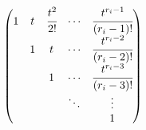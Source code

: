 {\begin{solution}
\begin{align*}
\begin{pmatrix}
                                                                                 1 & t & \cfrac{t^2}{2!} & \cdots & \cfrac{t^{r_i-1}}{\left(r_i-1\right)!}  \\
                                                                                   & 1 & t               & \cdots & \cfrac{t^{r_i-2}}{\left(r_i-2\right)!}  \\
                                                                                   &   & 1               & \cdots & \cfrac{t^{r_i-3}}{\left(r_i-3 \right)!} \\
                                                                                   &   &                 & \ddots & \vdots                                  \\
                                                                                   &   &                 &        & 1
                                                                             \end{pmatrix}
        \end{align*}
    \end{solution}
}